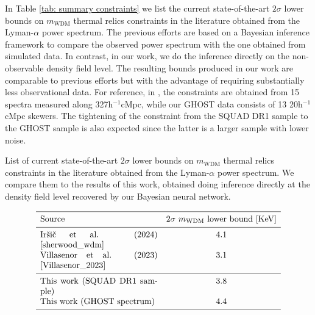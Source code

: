 In Table \ref{tab: summary constraints} we list the current state-of-the-art $2\sigma$ lower bounds on $m_{\mathrm{WDM}}$ thermal relics constraints in the literature obtained from the Lyman-$\alpha$ power spectrum. The previous efforts are based on a Bayesian inference framework to compare the observed power spectrum with the one obtained from simulated data. In contrast, in our work, we do the inference directly on the non-observable density field level. The resulting bounds produced in our work are comparable to previous efforts but with the advantage of requiring substantially less observational data. For reference, in \cite{sherwood_wdm}, the constraints are obtained from 15 spectra measured along 327h$^{-1}$cMpc,  while our GHOST data consists of 13  20h$^{-1}$cMpc skewers. The tightening of the constraint from the SQUAD DR1 sample to the GHOST sample is also expected since the latter is a larger sample with lower noise.
\begin{table}[h!]
    \caption[]{List of  current state-of-the-art $2\sigma$ lower bounds on $m_{\mathrm{WDM}}$ thermal relics constraints in the literature obtained from the Lyman-$\alpha$ power spectrum. We compare them to the results of this work, obtained doing inference directly at the density field level recovered by our Bayesian neural network. }
       \label{tab: summary constraints}
   $$ 
       \begin{array}{p{0.4\linewidth}c}
          \hline
          \noalign{\smallskip}
          Source &  2\sigma\ m_{\mathrm{WDM}} \mathrm{{\ lower \ bound\ [KeV]}}  \\ 
          \noalign{\smallskip}
          \hline
          \noalign{\smallskip}
          Ir\v{s}i\v{c} et al. (2024) \cite{sherwood_wdm} & 4.1      \\
          Villasenor et al. (2023) \cite{Villasenor_2023} & 3.1      \\
          \noalign{\smallskip}
          \hline
          \noalign{\smallskip}
          This work (SQUAD DR1 sample)  & 3.8   \\
          This work (GHOST spectrum)  & 4.4        \\

          \noalign{\smallskip}
          \hline
       \end{array}
   $$ 
 \end{table}















